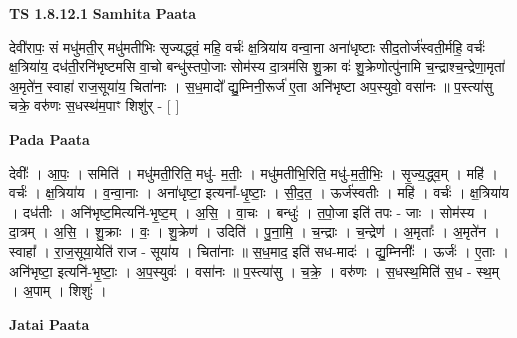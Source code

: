 \documentclass[17pt]{extarticle}
\begin{document}
\textbf{TS 1.8.12.1 } \newline
\textbf{Samhita Paata} \newline

देवी॑रापः॒ सं मधु॑मती॒र् मधु॑मतीभिः सृज्यद्ध्वं॒ महि॒ वर्चः॑ क्ष॒त्रिया॑य वन्वा॒ना अना॑धृष्टाः सीद॒तोर्ज॑स्वती॒र्महि॒ वर्चः॑ क्ष॒त्रिया॑य॒ दध॑ती॒रनि॑भृष्टमसि वा॒चो बन्धु॑स्तपो॒जाः सोम॑स्य दा॒त्रम॑सि शु॒क्रा वः॑ शु॒क्रेणोत्पु॑नामि च॒न्द्राश्च॒न्द्रेणा॒मृता॑ अ॒मृते॑न॒ स्वाहा॑ राज॒सूया॑य॒ चिता॑नाः । स॒ध॒मादो᳚ द्यु॒म्निनी॒रूर्ज॑ ए॒ता अनि॑भृष्टा अप॒स्युवो॒ वसा॑नः ॥ प॒स्त्या॑सु चक्रे॒ वरु॑णः स॒धस्थ॑म॒पाꣳ शिशु॑र् - [ ] \newline

\textbf{Pada Paata} \newline

देवीः᳚ । आ॒पः॒ । समिति॑ । मधु॑मती॒रिति॒ मधु॑- म॒तीः॒ । मधु॑मतीभि॒रिति॒ मधु॑-म॒ती॒भिः॒ । सृ॒ज्य॒द्ध्व॒म् । महि॑ । वर्चः॑ । क्ष॒त्रिया॑य । व॒न्वा॒नाः । अना॑धृष्टा॒ इत्यना᳚-धृ॒ष्टाः॒ । सी॒द॒त॒ । ऊर्ज॑स्वतीः । महि॑ । वर्चः॑ । क्ष॒त्रिया॑य । दध॑तीः । अनि॑भृष्ट॒मित्यनि॑-भृ॒ष्ट॒म् । अ॒सि॒ । वा॒चः । बन्धुः॑ । त॒पो॒जा इति॑ तपः - जाः । सोम॑स्य । दा॒त्रम् । अ॒सि॒ । शु॒क्राः । वः॒ । शु॒क्रेण॑ । उदिति॑ । पु॒ना॒मि॒ । च॒न्द्राः । च॒न्द्रेण॑ । अ॒मृताः᳚ । अ॒मृते॑न । स्वाहा᳚ । रा॒ज॒सूया॒येति॑ राज - सूया॑य । चिता॑नाः ॥ स॒ध॒माद॒ इति॑ सध-मादः॑ । द्यु॒म्निनीः᳚ । ऊर्जः॑ । ए॒ताः । अनि॑भृष्टा॒ इत्यनि॑-भृ॒ष्टाः॒ । अ॒प॒स्युवः॑ । वसा॑नः ॥ प॒स्त्या॑सु । च॒क्रे॒ । वरु॑णः । स॒धस्थ॒मिति॑ स॒ध - स्थ॒म् । अ॒पाम् । शिशुः॑ ।  \newline



\textbf{Jatai Paata} \newline
\end{document}
